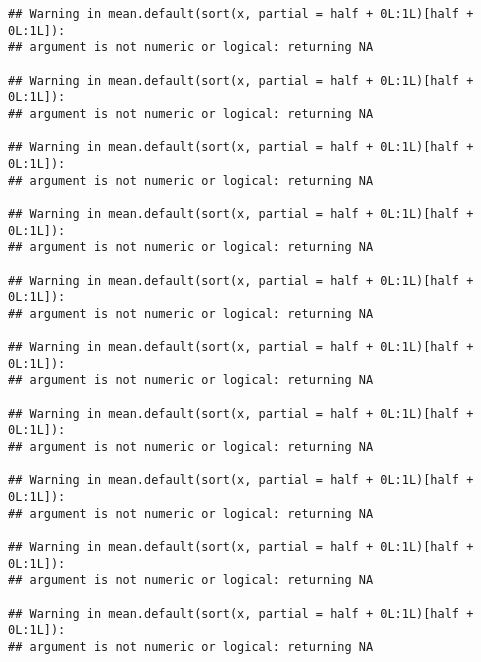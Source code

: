 \documentclass[
]{article}
\begin{document}
\begin{verbatim}
## Warning in mean.default(sort(x, partial = half + 0L:1L)[half + 0L:1L]):
## argument is not numeric or logical: returning NA

## Warning in mean.default(sort(x, partial = half + 0L:1L)[half + 0L:1L]):
## argument is not numeric or logical: returning NA

## Warning in mean.default(sort(x, partial = half + 0L:1L)[half + 0L:1L]):
## argument is not numeric or logical: returning NA

## Warning in mean.default(sort(x, partial = half + 0L:1L)[half + 0L:1L]):
## argument is not numeric or logical: returning NA

## Warning in mean.default(sort(x, partial = half + 0L:1L)[half + 0L:1L]):
## argument is not numeric or logical: returning NA

## Warning in mean.default(sort(x, partial = half + 0L:1L)[half + 0L:1L]):
## argument is not numeric or logical: returning NA

## Warning in mean.default(sort(x, partial = half + 0L:1L)[half + 0L:1L]):
## argument is not numeric or logical: returning NA

## Warning in mean.default(sort(x, partial = half + 0L:1L)[half + 0L:1L]):
## argument is not numeric or logical: returning NA

## Warning in mean.default(sort(x, partial = half + 0L:1L)[half + 0L:1L]):
## argument is not numeric or logical: returning NA

## Warning in mean.default(sort(x, partial = half + 0L:1L)[half + 0L:1L]):
## argument is not numeric or logical: returning NA
\end{verbatim}
\end{document}
